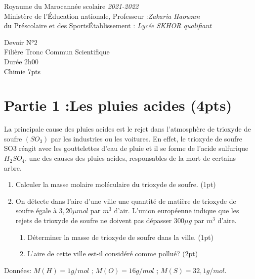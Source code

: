 \documentclass[12pt]{article}
\newcommand\headerMe[2]{\noindent{}#1\hfill#2}
\begin{document}
\headerMe{Royaume du Maroc}{année scolaire \emph{2021-2022}}\\
\headerMe{Ministère de l'Éducation nationale, }{  Professeur :\emph{Zakaria Haouzan}}\\
\headerMe{du Préscolaire et des Sports}{Établissement : \emph{Lycée SKHOR qualifiant}}\\

\begin{center}
Devoir  N°2 \\
   Filière Tronc Commun Scientifique\\
Durée 2h00
\\
    \vspace{.2cm}
\hrulefill
\Large{Chimie 7pts}
\hrulefill\\

\end{center}
 \section*{Partie 1 :Les pluies acides \dotfill (4pts) }
La principale cause des pluies acides est le rejet dans l'atmosphère de trioxyde de soufre $(SO_3)$ par les industries ou les voitures. En effet, le trioxyde de soufre SO3 réagit avec les gouttelettes d'eau de pluie et il se forme de l'acide sulfurique $H_2SO_4$, une des causes des pluies acides, responsables de la mort de certains arbre.

\begin{enumerate}
    \item Calculer la masse molaire moléculaire du trioxyde de soufre. \dotfill(1pt)
    \item On détecte dans l'aire d'une ville une quantité de matière de trioxyde de soufre égale à $3,20\mu mol$ par $m^3$ d'air. L'union européenne indique que les rejets de trioxyde de soufre ne doivent pas dépasser $300\mu g$ par $m^3$
d'aire.
        \begin{enumerate}
    \item Déterminer la masse de trioxyde de soufre dans la ville. \dotfill(1pt)
    \item L'aire de cette ville est-il considéré comme pollué? \dotfill(2pt)
        \end{enumerate}
\end{enumerate}
Données: $M(H) = 1 g/mol$ ; $M(O) = 16 g/mol$ ; $M(S) = 32,1 g/mol$.
\end{document}
